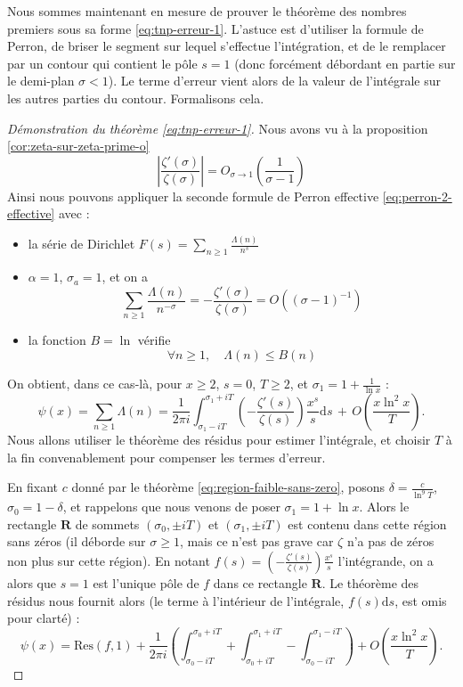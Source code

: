 \documentclass[french]{report}
\begin{document}
Nous sommes maintenant en mesure de prouver le théorème des nombres premiers sous sa forme \ref{eq:tnp-erreur-1}. L'astuce est d'utiliser la formule de Perron, de briser le segment sur lequel s'effectue l'intégration, et de le remplacer par un contour qui contient le pôle $s=1$ (donc forcément débordant en partie sur le demi-plan $\sigma<1$). Le terme d'erreur vient alors de la valeur de l'intégrale sur les autres parties du contour. Formalisons cela.

\begin{proof}[Démonstration du théorème \ref{eq:tnp-erreur-1}]
  Nous avons vu à la proposition \ref{cor:zeta-sur-zeta-prime-o} 
  \[ \left|\frac{\zeta'(\sigma)}{\zeta(\sigma)}\right| = O_{\sigma\to1}\left(\frac{1}{\sigma-1}\right) \]
  Ainsi nous pouvons appliquer la seconde formule de Perron effective \ref{eq:perron-2-effective} avec :
  \begin{itemize}
    \item la série de Dirichlet $F(s)=\sum_{n\geq1}\frac{\Lambda(n)}{n^s}$
    \item $\alpha=1$, $\sigma_a=1$, et on a
      \[
        \sum_{n\geq1}\frac{\Lambda(n)}{n^{-\sigma}}
        = -\frac{\zeta'(\sigma)}{\zeta(\sigma)}
        = O((\sigma-1)^{-1})
        \]
    \item la fonction $B=\ln$ vérifie
    \[ \forall n\geq1,\quad\Lambda(n)\leq B(n) \]
  \end{itemize}
  On obtient, dans ce cas-là, pour $x\geq2$, $s=0$, $T\geq2$, et $\sigma_1=1+\frac{1}{\ln x}$ :
  \[ \psi(x) = \sum_{n\geq1}\Lambda(n) = \frac{1}{2\pi i}\int_{\sigma_1-iT}^{\sigma_1+iT}\left(-\frac{\zeta'(s)}{\zeta(s)}\right)\frac{x^s}{s}\mathrm{d}s\,+\,O\left(\frac{x\ln^2 x}{T}\right). \]
  Nous allons utiliser le théorème des résidus pour estimer l'intégrale, et choisir $T$ à la fin convenablement pour compenser les termes d'erreur.

  En fixant $c$ donné par le théorème \ref{eq:region-faible-sans-zero}, posons $\delta=\frac{c}{\ln^9T}$, $\sigma_0=1-\delta$, et rappelons que nous venons de poser $\sigma_1=1+\ln x$. Alors le rectangle $\mathbf{R}$ de sommets $(\sigma_0,\pm iT)$ et $(\sigma_1,\pm iT)$ est contenu dans cette région sans zéros (il déborde sur $\sigma\geq 1$, mais ce n'est pas grave car $\zeta$ n'a pas de zéros non plus sur cette région). En notant $f(s)=\left(-\frac{\zeta'(s)}{\zeta(s)}\right)\frac{x^s}{s}$ l'intégrande, on a alors que $s=1$ est l'unique pôle de $f$ dans ce rectangle $\mathbf{R}$. Le théorème des résidus nous fournit alors (le terme à l'intérieur de l'intégrale, $f(s)\mathrm{d}s$, est omis pour clarté) :
  \[ \psi(x) = \mathrm{Res}(f,1) + \frac{1}{2\pi i}\left(
    \int_{\sigma_0-iT}^{\sigma_0+iT}
    +\int_{\sigma_0+iT}^{\sigma_1+iT}
    -\int_{\sigma_0-iT}^{\sigma_1-iT}
    \right)
    +O\left(\frac{x\ln^2x}{T}\right). \]


\end{proof}
\end{document}
